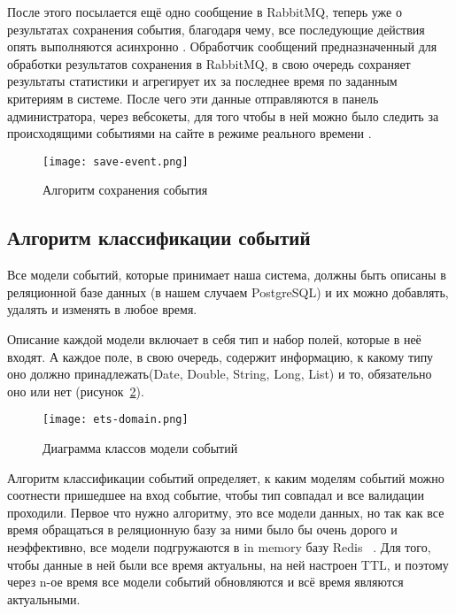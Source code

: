 После этого посылается ещё одно сообщение в RabbitMQ, теперь уже о результатах сохранения события, благодаря чему, все последующие действия опять выполняются асинхронно .
Обработчик сообщений предназначенный для обработки результатов сохранения в RabbitMQ, в свою очередь сохраняет результаты статистики и агрегирует их за последнее время по заданным критериям в системе. После чего эти данные отправляются в панель администратора, через вебсокеты, для того чтобы в ней можно было следить за происходящими событиями на сайте в режиме реального времени .%


\pagebreak
\begin{figure}[h]
\centering
  \texttt{[image: save-event.png]}  
  \caption{Алгоритм сохранения события}
  \label{fig:save-event}
\end{figure} 

\subsection{Алгоритм классификации событий}
\label{sub:development:klassific}
Все модели событий, которые принимает наша система, должны быть описаны в реляционной базе данных (в нашем случаем PostgreSQL) и их можно добавлять, удалять и изменять в любое время. 

Описание каждой модели включает в себя тип и набор полей, которые в неё входят. А каждое поле, в свою очередь, содержит информацию, к какому типу оно должно принадлежать(Date, Double, String, Long, List) и то, обязательно оно или нет (рисунок~\ref{fig:ets-domain}). 


\begin{figure}[h]
\centering
  \texttt{[image: ets-domain.png]}  
  \caption{Диаграмма классов модели событий}
  \label{fig:ets-domain}
\end{figure} 


Алгоритм классификации событий определяет, к каким моделям событий можно соотнести пришедшее на вход событие, чтобы тип совпадал и все валидации проходили.
Первое что нужно алгоритму, это все модели данных, но так как все время обращаться в реляционную базу за ними было бы очень дорого и неэффективно, все модели подгружаются в in memory базу Redis ~\cite{redis}. Для того, чтобы данные в ней были все время актуальны, на ней настроен TTL, и поэтому через n-ое время все модели событий обновляются и всё время являются актуальными.

